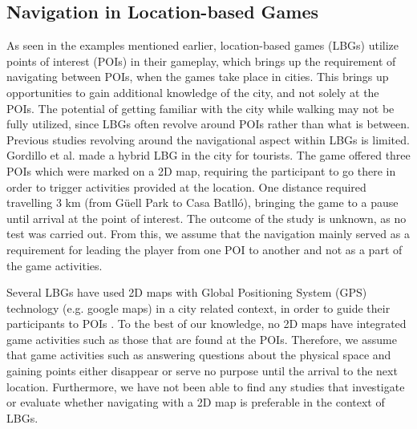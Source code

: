\subsection{Navigation in Location-based Games}
As seen in the examples mentioned earlier, location-based games (LBGs) utilize points of interest (POIs) in their gameplay, which brings up the requirement of navigating between POIs, when the games take place in cities. This brings up opportunities to gain additional knowledge of the city, and not solely at the POIs. The potential of getting familiar with the city while walking may not be fully utilized, since LBGs often revolve around POIs rather than what is between. Previous studies revolving around the navigational aspect within LBGs is limited. 
Gordillo et al. made a hybrid LBG in the city for tourists\cite{Learninggamified}. The game offered three POIs which were marked on a 2D map, requiring the participant to go there in order to trigger activities provided at the location.  One distance required travelling 3 km (from Güell Park to Casa Batlló), bringing the game to a pause until arrival at the point of interest.  The outcome of the study is unknown, as no test was carried out. From this, we assume that the navigation mainly served as a requirement for leading the player from one POI to another and not as a part of the game activities.

Several LBGs have used 2D maps with Global Positioning System (GPS) technology (e.g. google maps) in a city related context, in order to guide their participants to POIs \cite{TheoreticalAndMethod, Learninggamified, knowcity, Carrigy:2010:DEP:1868914.1868929, GamingTourism, Procyk:2013:GLG:2468356.2468550, Bell:2009:ESN:1518701.1518723}. To the best of our knowledge, no 2D maps have integrated game activities such as those that are found at the POIs. Therefore, we assume that game activities such as answering questions about the physical space and gaining points either disappear or serve no purpose until the arrival to the next location. Furthermore, we have not been able to find any studies that investigate or evaluate whether navigating with a 2D map is preferable in the context of LBGs.

